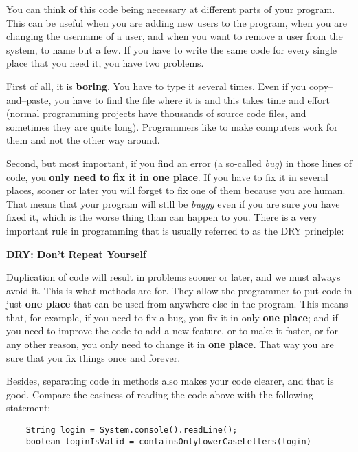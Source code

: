 You can think of this code being necessary at different parts of
your program. This can be useful when you are adding new users to the
program, when you are changing the username of a user, and when
you want to remove a user from the system, to name but a few. If you
have to write the same code for every single place that you need it,
you have two problems.

First of all, it is \textbf{boring}. You have to type it several
times. Even if you copy--and--paste, you have to find the file where
it is and this takes time and effort 
(normal programming projects have thousands of source
code files, and sometimes they are quite long). Programmers like to
make computers work for them and not the other way around.

Second, but most important, if you find an error (a so-called
\emph{bug}) in those lines of code, you \textbf{only need to fix it in one
place}. If you have to fix it in several places, sooner or later you
will forget to fix one of them because you are human. That means that your
program will still be \emph{buggy} even if you are sure you have fixed
it, which is the worse thing than can happen to you. There is a very
important rule in programming that is usually referred to as the DRY
principle: 

\begin{center}
\vspace{1em}
\textbf{\large DRY: Don't Repeat Yourself}
\vspace{1em}
\end{center}

Duplication of code will result in problems sooner or later, and
we must always avoid it. This is what methods are for. They allow the
programmer to put code in just \textbf{one place} 
that can be used from
anywhere else in the program. This means that, for example, if you
need to fix a bug, you fix it in only \textbf{one place}; 
and if you need to
improve the code to add a new feature, or to make it faster, or for
any other reason, you only need to change it 
in \textbf{one place}. That way
you are sure that you fix things once and forever. 

Besides, separating code in methods also makes your code
clearer, and that is good. 
Compare the easiness of reading the code above with the
following statement: 

\begin{verbatim}
    String login = System.console().readLine();
    boolean loginIsValid = containsOnlyLowerCaseLetters(login)
\end{verbatim}

